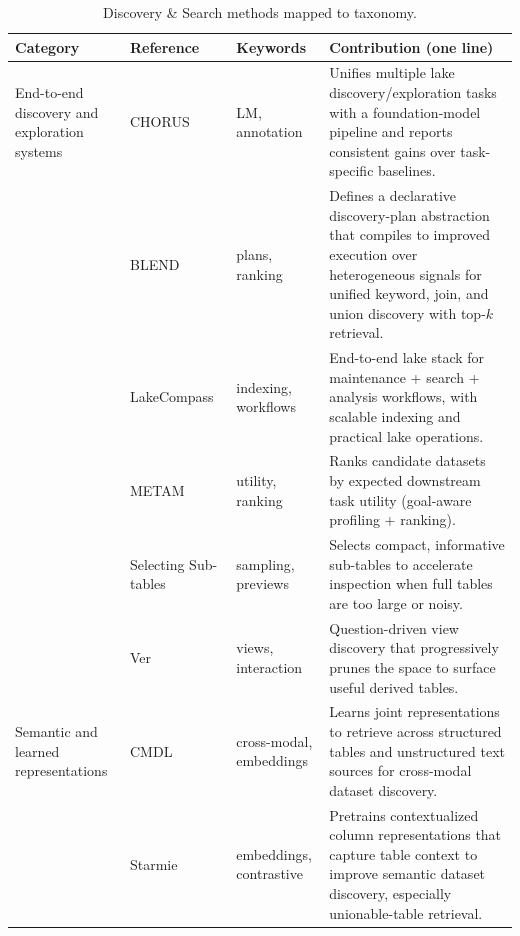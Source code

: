 \documentclass[sigconf,nonacm]{acmart}
\newcommand{\tbl}{%
  \scriptsize
  \setlength{\tabcolsep}{4pt}%
  \renewcommand{\arraystretch}{1.12}%
}
\begin{document}
\begin{table}[!htbp]
\caption{Discovery \& Search methods mapped to taxonomy.}
\label{tab:discovery-methods}
\tbl
\begin{tabularx}{\textwidth}{@{}p{24mm}p{28mm}p{18mm}Y@{}}
\toprule
\textbf{Category} & \textbf{Reference} & \textbf{Keywords} & \textbf{Contribution (one line)} \\
\midrule

End-to-end discovery and exploration systems &
CHORUS~\cite{10.14778/3659437.3659461} &
LM, annotation &
Unifies multiple lake discovery/exploration tasks with a foundation-model pipeline and reports consistent gains over task-specific baselines. \\

~ &
BLEND~\cite{11112882} &
plans, ranking &
Defines a declarative discovery-plan abstraction that compiles to improved execution over heterogeneous signals for unified keyword, join, and union discovery with top-$k$ retrieval. \\

~ &
LakeCompass~\cite{10.14778/3685800.3685880} &
indexing, workflows &
End-to-end lake stack for maintenance + search + analysis workflows, with scalable indexing and practical lake operations. \\

~ &
METAM~\cite{10184845} &
utility, ranking &
Ranks candidate datasets by expected downstream task utility (goal-aware profiling + ranking). \\

~ &
Selecting Sub-tables~\cite{10184535} &
sampling, previews &
Selects compact, informative sub-tables to accelerate inspection when full tables are too large or noisy. \\

~ &
Ver~\cite{10184768} &
views, interaction &
Question-driven view discovery that progressively prunes the space to surface useful derived tables. \\

\midrule

Semantic and learned representations &
CMDL~\cite{10.14778/3611479.3611533} &
cross-modal, embeddings &
Learns joint representations to retrieve across structured tables and unstructured text sources for cross-modal dataset discovery. \\

~ &
Starmie~\cite{10.14778/3587136.3587146} &
embeddings, contrastive &
Pretrains contextualized column representations that capture table context to improve semantic dataset discovery, especially unionable-table retrieval. \\


\end{tabularx}
\end{table}
\end{document}
